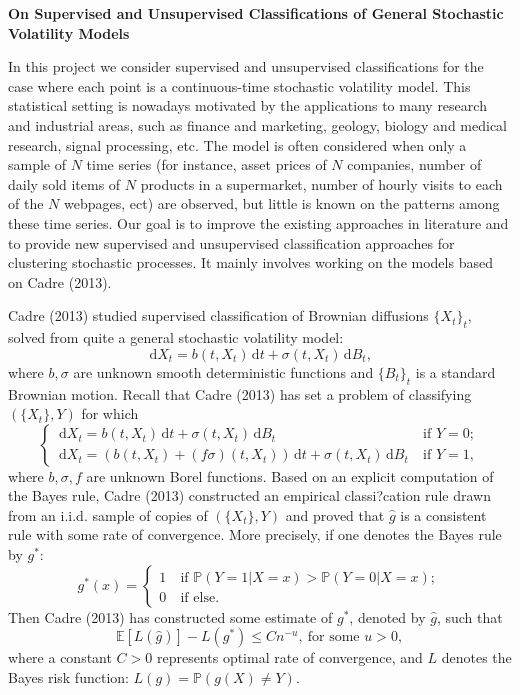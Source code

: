 \documentclass[9pt,a4paper]{article}
\def\ud{\, \mathrm{d}}
\begin{document}
\begin{center}
{\bf On Supervised and Unsupervised Classifications of General Stochastic Volatility Models}\\
\end{center}
\vspace{1cm}
In this project we consider supervised and unsupervised classifications for the case where each point is a continuous-time stochastic volatility model. This statistical setting is nowadays motivated by the applications to many research and industrial areas, such as finance and marketing, geology, biology and medical research, signal processing, etc.  The model is often considered when only a sample of $N$ time series (for instance, asset prices of $N$ companies, number of daily sold items of $N$ products in a supermarket, number of hourly visits to each of the $N$ webpages, ect) are observed, but little is known on the patterns among these time series. Our goal is to improve the existing approaches in literature and to provide new supervised and unsupervised classification approaches for clustering stochastic processes. It mainly involves working on the models based on Cadre (2013).

Cadre (2013) studied supervised classification of Brownian diffusions $\{X_t\}_{t}$, solved from quite a general stochastic volatility model:
$$
\ud X_t= b(t,X_t)\ud t+\sigma(t,X_t)\ud B_t,
$$
where $b,\sigma$ are unknown smooth deterministic functions and $\{B_t\}_t$ is a standard Brownian motion. Recall that Cadre (2013) has set a problem of classifying $(\{X_t\},Y)$ for which
\begin{equation}
\label{model1}
\left\{
\begin{array}{ll}
\ud X_t= b(t,X_t)\ud t+\sigma(t,X_t)\ud B_t&~\mbox{if $Y=0$};\\
\ud X_t= \left(b(t,X_t)+(f\sigma)(t,X_t)\right)\ud t+\sigma(t,X_t)\ud B_t&~\mbox{if $Y=1$},
\end{array}\right.
\end{equation}
where $b,\sigma,f$ are unknown Borel functions.  Based on an explicit computation of the Bayes rule, Cadre (2013) constructed an empirical classi?cation rule  drawn from an i.i.d. sample of copies of $(\{X_t\},Y)$ and proved that $\hat g$ is a consistent rule with some rate of convergence. More precisely, if one denotes the Bayes rule by $g^*$:
 $$
 g^*(x)=\left\{
 \begin{array}{ll}
 1&~\mbox{if $\mathbb P(Y=1|X=x)>\mathbb P(Y=0|X=x)$};\\
 0&~\mbox{if else}.
 \end{array}\right.
 $$
 Then Cadre (2013) has constructed some estimate of $g^*$, denoted by $\hat g$, such that
  $$
  \mathbb E[L(\hat g)]-L(g^*)\le C n^{-u},~\mbox{for some $u>0$},
  $$
  where a constant $C>0$ represents optimal rate of convergence, and $L$ denotes the Bayes risk function: $L(g)=\mathbb P(g(X)\neq Y)$.
\end{document}
